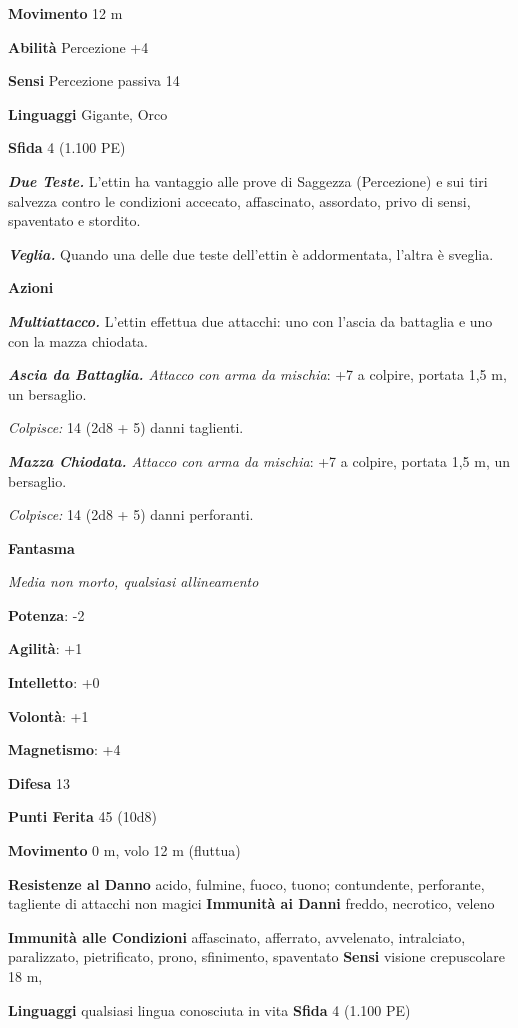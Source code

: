 \begin{multicols}{2}
\textbf{Movimento} 12 m

\textbf{Abilità} Percezione +4

\textbf{Sensi} Percezione passiva 14

\textbf{Linguaggi} Gigante, Orco

\textbf{Sfida} 4 (1.100 PE)

\emph{\textbf{Due Teste.}} L'ettin ha vantaggio alle prove di Saggezza
(Percezione) e sui tiri salvezza contro le condizioni accecato,
affascinato, assordato, privo di sensi, spaventato e stordito.

\emph{\textbf{Veglia.}} Quando una delle due teste dell'ettin è
addormentata, l'altra è sveglia.

\textbf{Azioni}

\emph{\textbf{Multiattacco.}} L'ettin effettua due attacchi: uno con
l'ascia da battaglia e uno con la mazza chiodata.

\emph{\textbf{Ascia da Battaglia.} Attacco con arma da mischia}: +7 a
colpire, portata 1,5 m, un bersaglio.

\emph{Colpisce:} 14 (2d8 + 5) danni taglienti.

\emph{\textbf{Mazza Chiodata.} Attacco con arma da mischia}: +7 a
colpire, portata 1,5 m, un bersaglio.

\emph{Colpisce:} 14 (2d8 + 5) danni perforanti.

\textbf{Fantasma}

\emph{Media non morto, qualsiasi allineamento}

\textbf{Potenza}: -2

\textbf{Agilità}: +1

\textbf{Intelletto}: +0

\textbf{Volontà}: +1

\textbf{Magnetismo}: +4

\textbf{Difesa} 13

\textbf{Punti Ferita} 45 (10d8)

\textbf{Movimento} 0 m, volo 12 m (fluttua)

\textbf{Resistenze al Danno} acido, fulmine, fuoco, tuono; contundente,
perforante, tagliente di attacchi non magici \textbf{Immunità ai Danni}
freddo, necrotico, veleno

\textbf{Immunità alle Condizioni} affascinato, afferrato, avvelenato,
intralciato, paralizzato, pietrificato, prono, sfinimento, spaventato
\textbf{Sensi} visione crepuscolare 18 m, 

\textbf{Linguaggi} qualsiasi lingua conosciuta in vita \textbf{Sfida} 4
(1.100 PE)


\end{multicols}
